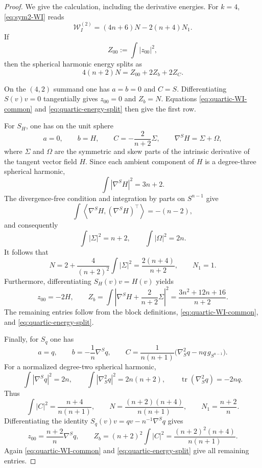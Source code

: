 \documentclass[reqno,11pt]{amsart}
\theoremstyle{definition}
\newcommand{\tr}{\operatorname{tr}}
\newcommand{\inner}[2]{\left\langle #1,#2\right\rangle}
\begin{document}
\begin{proof}
We give the calculation, including the derivative energies.  For $k=4$,
\eqref{eq:sym2-WI} reads
\begin{equation}\label{eq:quartic-WI-common}
 \mathscr W_I^{(2)}=(4n+6)N-2(n+4)N_1.
\end{equation}
If
$$
 Z_{00}:=\int|z_{00}|^2,
$$
then the spherical harmonic energy splits as
\begin{equation}\label{eq:quartic-energy-split}
 4(n+2)N=Z_{00}+2Z_b+2Z_C.
\end{equation}

On the $(4,2)$ summand one has $a=b=0$ and $C=S$.  Differentiating
$S(v)v=0$ tangentially gives $z_{00}=0$ and $Z_b=N$.  Equations
\eqref{eq:quartic-WI-common} and \eqref{eq:quartic-energy-split} then give
the first row.

For $S_H$, one has on the unit sphere
$$
 a=0,
 \qquad b=H,
 \qquad C=-\frac2{n+2}\Sigma,
 \qquad \nabla^SH=\Sigma+\Omega,
$$
where $\Sigma$ and $\Omega$ are the symmetric and skew parts of the
intrinsic derivative of the tangent vector field $H$.  Since each ambient
component of $H$ is a degree-three spherical harmonic,
$$
 \int|\nabla^SH|^2=3n+2.
$$
The divergence-free condition and integration by parts on $S^{n-1}$ give
$$
 \int\inner{\nabla^SH}{(\nabla^SH)^\top}=-(n-2),
$$
and consequently
\begin{equation*}
 \int|\Sigma|^2=n+2,
 \qquad
 \int|\Omega|^2=2n.
\end{equation*}
It follows that
$$
 N=2+\frac4{(n+2)^2}\int|\Sigma|^2
   =\frac{2(n+4)}{n+2},
 \qquad N_1=1.
$$
Furthermore, differentiating $S_H(v)v=H(v)$ yields
$$
 z_{00}=-2H,
 \qquad
 Z_b=\int\left|\nabla^SH+\frac2{n+2}\Sigma\right|^2
 =\frac{3n^2+12n+16}{n+2}.
$$
The remaining entries follow from the block definitions,
\eqref{eq:quartic-WI-common}, and
\eqref{eq:quartic-energy-split}.

Finally, for $S_q$ one has
$$
 a=q,
 \qquad
 b=-\frac1n\nabla^Sq,
 \qquad
 C=\frac1{n(n+1)}
 \bigl(\nabla_S^2q-nq\,g_{S^{n-1}}\bigr).
$$
For a normalized degree-two spherical harmonic,
\begin{equation*}
 \int|\nabla^Sq|^2=2n,
 \qquad
 \int|\nabla_S^2q|^2=2n(n+2),
 \qquad
 \tr(\nabla_S^2q)=-2nq.
\end{equation*}
Thus
$$
 \int|C|^2=\frac{n+4}{n(n+1)},
 \qquad
 N=\frac{(n+2)(n+4)}{n(n+1)},
 \qquad
 N_1=\frac{n+2}{n}.
$$
Differentiating the identity
$S_q(v)v=qv-n^{-1}\nabla^Sq$ gives
$$
 z_{00}=\frac{n+2}{n}\nabla^Sq,
 \qquad
 Z_b=(n+2)^2\int|C|^2
 =\frac{(n+2)^2(n+4)}{n(n+1)}.
$$
Again \eqref{eq:quartic-WI-common} and
\eqref{eq:quartic-energy-split} give all remaining entries.
\end{proof}
\end{document}
